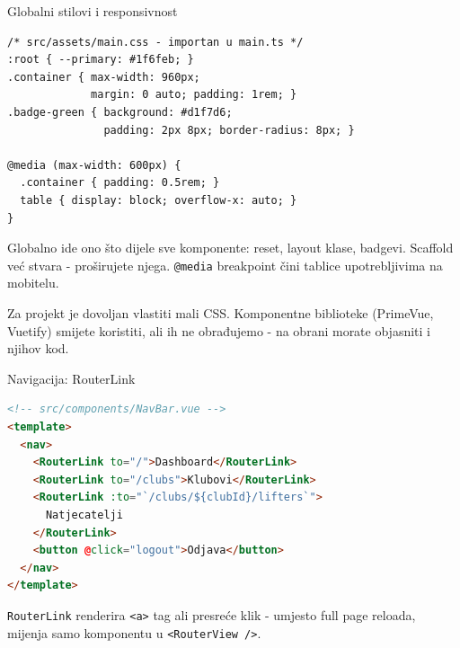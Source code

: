 \begin{frame}[fragile,shrink=5]{Globalni stilovi i responsivnost}
\begin{lstlisting}[language=html]
/* src/assets/main.css - importan u main.ts */
:root { --primary: #1f6feb; }
.container { max-width: 960px;
             margin: 0 auto; padding: 1rem; }
.badge-green { background: #d1f7d6;
               padding: 2px 8px; border-radius: 8px; }

@media (max-width: 600px) {
  .container { padding: 0.5rem; }
  table { display: block; overflow-x: auto; }
}
\end{lstlisting}

\vspace{0.4em}
Globalno ide ono što dijele sve komponente: reset, layout klase, badgevi. Scaffold već stvara  - proširujete njega. \texttt{@media} breakpoint čini tablice upotrebljivima na mobitelu.

\vspace{0.4em}
Za projekt je dovoljan vlastiti mali CSS. Komponentne biblioteke (PrimeVue, Vuetify) smijete koristiti, ali ih ne obrađujemo - na obrani morate objasniti i njihov kod.
\end{frame}

\begin{frame}[fragile,shrink=5]{Navigacija: RouterLink}
\begin{lstlisting}[language=html]
<!-- src/components/NavBar.vue -->
<template>
  <nav>
    <RouterLink to="/">Dashboard</RouterLink>
    <RouterLink to="/clubs">Klubovi</RouterLink>
    <RouterLink :to="`/clubs/${clubId}/lifters`">
      Natjecatelji
    </RouterLink>
    <button @click="logout">Odjava</button>
  </nav>
</template>
\end{lstlisting}

\vspace{0.4em}
\texttt{RouterLink} renderira \texttt{<a>} tag ali presreće klik - umjesto full page reloada, mijenja samo komponentu u \texttt{<RouterView />}.
\end{frame}


